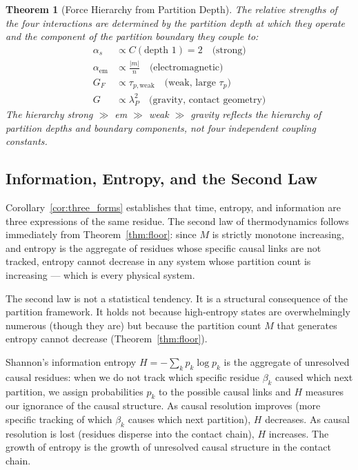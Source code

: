 \documentclass[11pt,twocolumn,a4paper]{article}
\theoremstyle{plain}
\newtheorem{theorem}{Theorem}[section]
\theoremstyle{definition}
\theoremstyle{remark}
\begin{document}
\begin{theorem}[Force Hierarchy from Partition Depth]
\label{thm:force_hierarchy}
The relative strengths of the four interactions are determined by the
partition depth at which they operate and the component of the partition
boundary they couple to:
\begin{align}
    \alpha_s &\propto C(\text{depth } 1) = 2 \quad \text{(strong)} \\
    \alpha_{\mathrm{em}} &\propto \frac{|m|}{n} \quad \text{(electromagnetic)} \\
    G_F &\propto \tau_{p,\mathrm{weak}} \quad \text{(weak, large } \tau_p) \\
    G &\propto \lambda_P^2 \quad \text{(gravity, contact geometry)}
\end{align}
The hierarchy strong $\gg$ em $\gg$ weak $\gg$ gravity reflects the hierarchy
of partition depths and boundary components, not four independent coupling
constants.
\end{theorem}

\subsection{Information, Entropy, and the Second Law}
\label{subsec:entropy}

Corollary~\ref{cor:three_forms} establishes that time, entropy, and information
are three expressions of the same residue. The second law of thermodynamics
follows immediately from Theorem~\ref{thm:floor}: since $M$ is strictly monotone
increasing, and entropy is the aggregate of residues whose specific causal links
are not tracked, entropy cannot decrease in any system whose partition count is
increasing --- which is every physical system.

The second law is not a statistical tendency. It is a structural consequence of
the partition framework. It holds not because high-entropy states are
overwhelmingly numerous (though they are) but because the partition count $M$
that generates entropy cannot decrease (Theorem~\ref{thm:floor}).

Shannon's information entropy $H = -\sum_k p_k \log p_k$ is the aggregate of
unresolved causal residues: when we do not track which specific residue $\beta_k$
caused which next partition, we assign probabilities $p_k$ to the possible
causal links and $H$ measures our ignorance of the causal structure. As
causal resolution improves (more specific tracking of which $\beta_k$ causes
which next partition), $H$ decreases. As causal resolution is lost (residues
disperse into the contact chain), $H$ increases. The growth of entropy is the
growth of unresolved causal structure in the contact chain.
\end{document}
